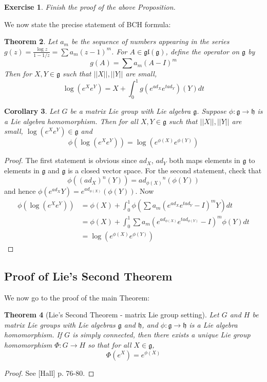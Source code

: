 \documentclass[11pt]{article}
\newtheorem{theorem}{Theorem}[section]
\newtheorem{corollary}[theorem]{Corollary}
\newtheorem{exercise}[theorem]{Exercise}
\newcommand{\mf}[1]{\mathfrak{#1}}
\begin{document}
\begin{exercise}
Finish the proof of the above Proposition.
\end{exercise}
We now state the precise statement of BCH formula:
\begin{theorem}
Let $a_m$ be the sequence of numbers appearing in the series $g(z) = \frac{\log z}{1-{1/z}} = \sum a_m (z-1)^m$. For $A \in \mf{gl}(\mf{g})$, define the operator on $\mf{g}$ by
$$g(A) = \sum a_m (A-I)^m$$
Then for $X, Y \in \mf{g}$ such that $||X||, ||Y||$ are small,
$$\log(e^Xe^Y) = X + \int_0^1 g(e^{ad_X}e^{tad_Y})(Y)dt$$
\end{theorem}
\begin{corollary}
Let $G$ be a matrix Lie group with Lie algebra $\mf{g}$. Suppose $\phi: \mf{g} \to \mf{h}$ is a Lie algebra homomorphism. Then for all $X, Y \in \mf{g}$ such that $||X||, ||Y||$ are small, $\log(e^Xe^Y) \in \mf{g}$ and
$$\phi(\log(e^Xe^Y)) = \log(e^{\phi(X)}e^{\phi(Y)})$$
\end{corollary}
\begin{proof}
The first statement is obvious since $ad_X$, $ad_Y$ both maps elements in $\mf{g}$ to elements in $\mf{g}$ and $\mf{g}$ is a closed vector space. For the second statement, check that
$$\phi((ad_X)^n(Y)) = {ad_{\phi(X)}}^n(\phi(Y))$$
and hence $\phi(e^{ad_X} Y) = e^{ad_{\phi(X)}}(\phi(Y))$. Now
\begin{align*}
\phi(
\log(e^Xe^Y)) &= \phi(X) + \int_0^1 \phi (\sum a_m (e^{ad_X}e^{tad_Y} - I)^m Y)dt\\
&= \phi(X) + \int_0^1 \sum a_m (e^{ad_{\phi(X)}}e^{t ad_{\phi(Y)}} - I)^m \phi(Y)dt\\
&= \log (e^{\phi(X)}e^{\phi(Y)})
\end{align*}
\end{proof}
\subsection{Proof of Lie's Second Theorem}
We now go to the proof of the main Theorem:
\begin{theorem}[Lie's Second Theorem - matrix Lie group setting] \label{algreptogprep}
Let $G$ and $H$ be matrix Lie groups with Lie algebras $\mf{g}$ and $\mf{h}$, and $\phi:\mf{g} \to \mf{h}$ is a Lie algebra homomorphism. If $G$ is simply connected, then there exists a unique Lie group homomorphism $\Phi: G \to H$ so that for all $X \in \mf{g}$,
$$\Phi(e^X) = e^{\phi(X)}$$
\end{theorem}
\begin{proof}
See [Hall] p. 76-80.
\end{proof}
\end{document}
